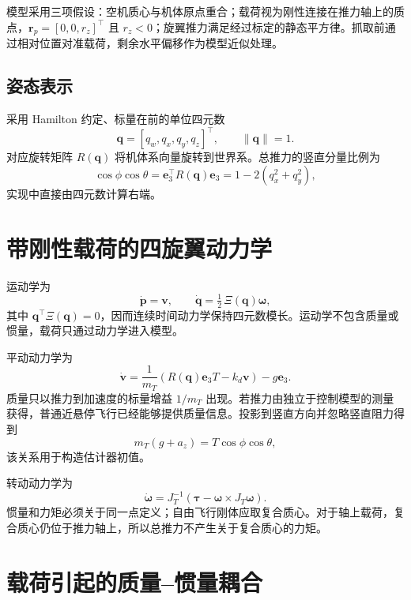 \documentclass[11pt,UTF8,fontset=none]{ctexrep}
\providecommand{\mT}{m_T}
\providecommand{\Jt}{J_T}
\providecommand{\rp}{\bm{r}_p}
\providecommand{\ev}{\bm e_3}
\begin{document}
模型采用三项假设：空机质心与机体原点重合；载荷视为刚性连接在推力轴上的质点，$\rp=[0,0,r_z]^\top$ 且 $r_z<0$；旋翼推力满足经过标定的静态平方律。抓取前通过相对位置对准载荷，剩余水平偏移作为模型近似处理。

\subsection{姿态表示}

采用 Hamilton 约定、标量在前的单位四元数
\begin{equation}
\bm q=[q_w,q_x,q_y,q_z]^\top,\qquad \|\bm q\|=1.
\end{equation}
对应旋转矩阵 $R(\bm q)$ 将机体系向量旋转到世界系。总推力的竖直分量比例为
\begin{equation}
\cos\phi\cos\theta=\ev^\top R(\bm q)\ev=1-2(q_x^2+q_y^2),
\end{equation}
实现中直接由四元数计算右端。

\section{带刚性载荷的四旋翼动力学}

运动学为
\begin{equation}
\dot{\bm p}=\bm v,\qquad
\dot{\bm q}=\tfrac12\,\Xi(\bm q)\bm\omega,
\end{equation}
其中 $\bm q^\top\Xi(\bm q)=0$，因而连续时间动力学保持四元数模长。运动学不包含质量或惯量，载荷只通过动力学进入模型。

平动动力学为
\begin{equation}
\dot{\bm v}=\frac{1}{\mT}\left(R(\bm q)\ev T-k_d\bm v\right)-g\ev.
\end{equation}
质量只以推力到加速度的标量增益 $1/\mT$ 出现。若推力由独立于控制模型的测量获得，普通近悬停飞行已经能够提供质量信息。投影到竖直方向并忽略竖直阻力得到
\begin{equation}
\mT(g+a_z)=T\cos\phi\cos\theta,
\end{equation}
该关系用于构造估计器初值。

转动动力学为
\begin{equation}
\dot{\bm\omega}=\Jt^{-1}\left(\bm\tau-\bm\omega\times\Jt\bm\omega\right).
\end{equation}
惯量和力矩必须关于同一点定义；自由飞行刚体应取复合质心。对于轴上载荷，复合质心仍位于推力轴上，所以总推力不产生关于复合质心的力矩。

\section{载荷引起的质量--惯量耦合}
\end{document}
